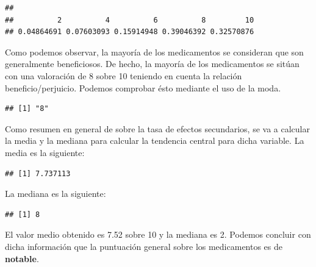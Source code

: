 \documentclass[spanish,]{article}
\newenvironment{Shaded}{\begin{snugshade}}{\end{snugshade}}
\newcommand{\KeywordTok}[1]{\textcolor[rgb]{0.13,0.29,0.53}{\textbf{#1}}}
\newcommand{\CommentTok}[1]{\textcolor[rgb]{0.56,0.35,0.01}{\textit{#1}}}
\newcommand{\OperatorTok}[1]{\textcolor[rgb]{0.81,0.36,0.00}{\textbf{#1}}}
\newcommand{\NormalTok}[1]{#1}
\begin{document}
\begin{verbatim}
## 
##          2          4          6          8         10 
## 0.04864691 0.07603093 0.15914948 0.39046392 0.32570876
\end{verbatim}

Como podemos observar, la mayoría de los medicamentos se consideran que
son generalmente beneficiosos. De hecho, la mayoría de los medicamentos
se sitúan con una valoración de 8 sobre 10 teniendo en cuenta la
relación beneficio/perjuicio. Podemos comprobar ésto mediante el uso de
la moda.

\begin{Shaded}
\end{Shaded}

\begin{verbatim}
## [1] "8"
\end{verbatim}

Como resumen en general de sobre la tasa de efectos secundarios, se va a
calcular la media y la mediana para calcular la tendencia central para
dicha variable. La media es la siguiente:

\begin{Shaded}
\end{Shaded}

\begin{verbatim}
## [1] 7.737113
\end{verbatim}

La mediana es la siguiente:

\begin{Shaded}
\end{Shaded}

\begin{verbatim}
## [1] 8
\end{verbatim}

El valor medio obtenido es 7.52 sobre 10 y la mediana es 2. Podemos
concluir con dicha información que la puntuación general sobre los
medicamentos es de \textbf{notable}.
\end{document}
